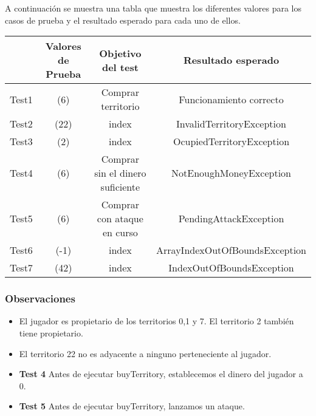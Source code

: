 A continuación se muestra una tabla que muestra los diferentes valores para los casos de prueba y el resultado esperado para cada uno de ellos.

{\footnotesize
\begin{longtable}[c]{lccc}
 & \textbf{Valores de Prueba} & \textbf{Objetivo del test} & \textbf{Resultado esperado}  \\
\hline \hline
\endhead

Test1 & (6)& Comprar territorio & Funcionamiento correcto \\
Test2 & (22) & index & InvalidTerritoryException \\
Test3 & (2)  & index & OcupiedTerritoryException \\
Test4 & (6)  & Comprar sin el dinero suficiente & NotEnoughMoneyException \\
Test5 & (6) & Comprar con ataque en curso  & PendingAttackException \\
Test6 & (-1)  & index & ArrayIndexOutOfBoundsException \\
Test7 & (42)  & index & IndexOutOfBoundsException \\

\hline
\end{longtable}
\subsubsection{Observaciones}
\begin{itemize}
 \item El jugador es propietario de los territorios 0,1 y 7. El territorio 2 también tiene propietario.
\item El territorio 22 no es adyacente a ninguno perteneciente al jugador.
\item \textbf{Test 4} Antes de ejecutar buyTerritory, establecemos el dinero del jugador a 0.
\item \textbf{Test 5} Antes de ejecutar buyTerritory, lanzamos un ataque.
\end{itemize}

}